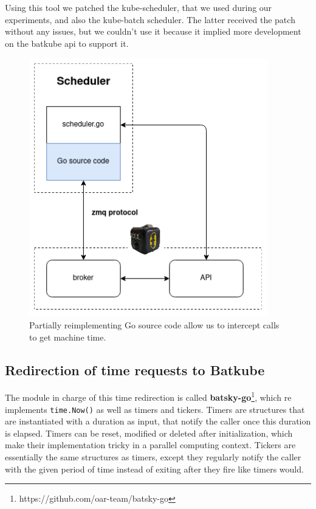 Using this tool we patched the kube-scheduler, that we used during our
experiments, and also the kube-batch scheduler.  The latter received the patch
without any issues, but we couldn't use it because it implied more development
on the batkube api to support it.

\begin{figure}[]
	\centering
	\includegraphics[scale=0.75]{imgs/time-hijack-Go.png}
	\caption{Partially reimplementing Go source code allow us to intercept calls to get machine time.}
	\label{fig:patch-time}
\end{figure}

\subsection{Redirection of time requests to Batkube}

The module in charge of this time redirection is called
\textbf{batsky-go}\footnote{https://github.com/oar-team/batsky-go}, which re
implements \texttt{time.Now()} as well as timers and tickers. Timers are
structures that are instantiated with a duration as input, that notify the
caller once this duration is elapsed. Timers can be reset, modified or deleted
after initialization, which make their implementation tricky in a parallel
computing context. Tickers are essentially the same structures as timers,
except they regularly notify the caller with the given period of time instead
of exiting after they fire like timers would.

